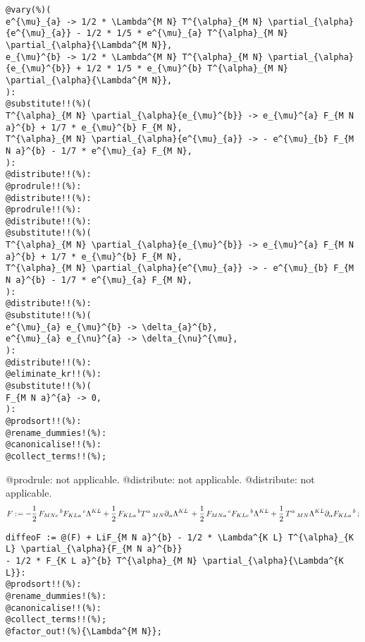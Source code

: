 \documentclass[11pt]{article}
\def\specialcolon{\mathrel{\mathop{:}}\hspace{-.5em}}
\begin{document}
{\color[named]{Blue}\begin{verbatim}
@vary(%)(
e^{\mu}_{a} -> 1/2 * \Lambda^{M N} T^{\alpha}_{M N} \partial_{\alpha}{e^{\mu}_{a}} - 1/2 * 1/5 * e^{\mu}_{a} T^{\alpha}_{M N} \partial_{\alpha}{\Lambda^{M N}},
e_{\mu}^{b} -> 1/2 * \Lambda^{M N} T^{\alpha}_{M N} \partial_{\alpha}{e_{\mu}^{b}} + 1/2 * 1/5 * e_{\mu}^{b} T^{\alpha}_{M N} \partial_{\alpha}{\Lambda^{M N}},
):
@substitute!!(%)(
T^{\alpha}_{M N} \partial_{\alpha}{e_{\mu}^{b}} -> e_{\mu}^{a} F_{M N a}^{b} + 1/7 * e_{\mu}^{b} F_{M N},
T^{\alpha}_{M N} \partial_{\alpha}{e^{\mu}_{a}} -> - e^{\mu}_{b} F_{M N a}^{b} - 1/7 * e^{\mu}_{a} F_{M N},
):
@distribute!!(%):
@prodrule!!(%):
@distribute!!(%):
@prodrule!!(%):
@distribute!!(%):
@substitute!!(%)(
T^{\alpha}_{M N} \partial_{\alpha}{e_{\mu}^{b}} -> e_{\mu}^{a} F_{M N a}^{b} + 1/7 * e_{\mu}^{b} F_{M N},
T^{\alpha}_{M N} \partial_{\alpha}{e^{\mu}_{a}} -> - e^{\mu}_{b} F_{M N a}^{b} - 1/7 * e^{\mu}_{a} F_{M N},
):
@distribute!!(%):
@substitute!!(%)(
e^{\mu}_{a} e_{\mu}^{b} -> \delta_{a}^{b},
e^{\mu}_{a} e_{\nu}^{a} -> \delta_{\nu}^{\mu},
):
@distribute!!(%):
@eliminate_kr!!(%):
@substitute!!(%)(
F_{M N a}^{a} -> 0,
):
@prodsort!!(%):
@rename_dummies!(%):
@canonicalise!!(%):
@collect_terms!!(%);
\end{verbatim}}
@prodrule: not applicable.
@distribute: not applicable.
@distribute: not applicable.
\begin{dmath*}[compact, spread=2pt]
F\specialcolon{}=  - \frac{1}{2}\, {F}_{M N c}\,^{b} {F}_{K L a}\,^{c} {\Lambda}^{K L} + \frac{1}{2}\, {F}_{K L a}\,^{b} {T}^{\alpha}\,_{M N} {\partial}_{\alpha}{{\Lambda}^{K L}}\,  + \frac{1}{2}\, {F}_{M N a}\,^{c} {F}_{K L c}\,^{b} {\Lambda}^{K L} + \frac{1}{2}\, {T}^{\alpha}\,_{M N} {\Lambda}^{K L} {\partial}_{\alpha}{{F}_{K L a}\,^{b}}\, ;
\end{dmath*}
{\color[named]{Blue}\begin{verbatim}
diffeoF := @(F) + LiF_{M N a}^{b} - 1/2 * \Lambda^{K L} T^{\alpha}_{K L} \partial_{\alpha}{F_{M N a}^{b}}
- 1/2 * F_{K L a}^{b} T^{\alpha}_{M N} \partial_{\alpha}{\Lambda^{K L}}:
@prodsort!!(%):
@rename_dummies!(%):
@canonicalise!!(%):
@collect_terms!!(%);
@factor_out!(%){\Lambda^{M N}};
\end{verbatim}}
\end{document}
